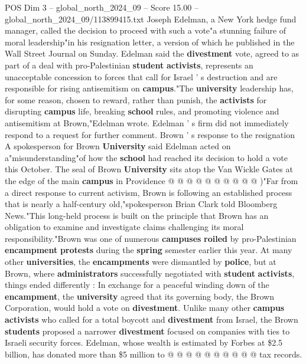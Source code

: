 \begin{textsample}{POS Dim 3 – global\_north\_2024\_09 – Score 15.00 – global\_north\_2024\_09/113899415.txt}  \label{ex:f3_pos_167}
Joseph Edelman, a New York hedge fund manager, called the decision to proceed with such a vote"a stunning failure of moral leadership"in his resignation letter, a version of which he published in the Wall Street Journal on Sunday.
Edelman said the \textbf{divestment} vote, agreed to as part of a deal with pro-Palestinian \textbf{student} \textbf{activists}, represents an unacceptable concession to forces that call for Israel ' s destruction and are responsible for rising antisemitism on \textbf{campus}."The \textbf{university} leadership has, for some reason, chosen to reward, rather than punish, the \textbf{activists} for disrupting \textbf{campus} life, breaking \textbf{school} rules, and promoting violence and antisemitism at Brown,"Edelman wrote.
Edelman ' s firm did not immediately respond to a request for further comment.
Brown ' s response to the resignation A spokesperson for Brown \textbf{University} said Edelman acted on a"misunderstanding"of how the \textbf{school} had reached its decision to hold a vote this October.
The seal of Brown \textbf{University} sits atop the Van Wickle Gates at the edge of the main \textbf{campus} in Providence @ @ @ @ @ @ @ @ @ @ )"Far from a direct response to current activism, Brown is following an established process that is nearly a half-century old,"spokesperson Brian Clark told Bloomberg News."This long-held process is built on the principle that Brown has an obligation to examine and investigate claims challenging its moral responsibility."Brown was one of numerous \textbf{campuses} \textbf{roiled} by pro-Palestinian \textbf{encampment} \textbf{protests} during the \textbf{spring} semester earlier this year.
At many other \textbf{universities}, the \textbf{encampments} were dismantled by \textbf{police}, but at Brown, where \textbf{administrators} successfully negotiated with \textbf{student} \textbf{activists}, things ended differently : In exchange for a peaceful winding down of the \textbf{encampment}, the \textbf{university} agreed that its governing body, the Brown Corporation, would hold a vote on \textbf{divestment}.
Unlike many other \textbf{campus} \textbf{activists} who called for a total boycott and \textbf{divestment} from Israel, the Brown \textbf{students} proposed a narrower \textbf{divestment} focused on companies with ties to Israeli security forces.
Edelman, whose wealth is estimated by Forbes at \$2.5 billion, has donated more than \$5 million to @ @ @ @ @ @ @ @ @ @ tax records.

\end{textsample}
